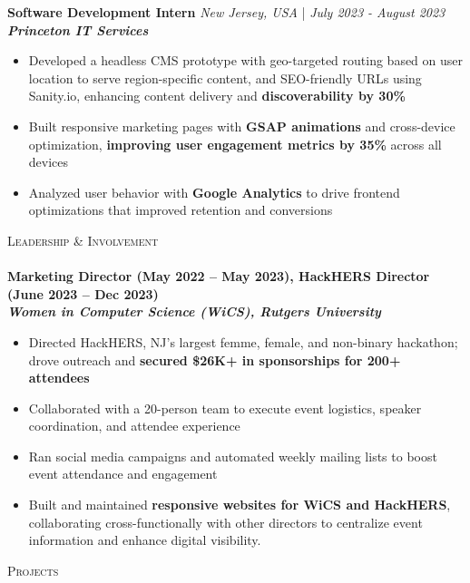 \documentclass[a4paper]{article}
\newcommand{\lineunder} {
    \vspace*{-8pt} \\
    \hspace*{-18pt} \hrulefill \\
}
\newcommand{\header} [1] {
    {\hspace*{-18pt}\vspace*{6pt} \textsc{#1}}
    \vspace*{-6pt} \lineunder
}
\begin{document}
\vspace{-2mm}
\textbf{Software Development Intern} \hfill \textit{New Jersey, USA} | \textit{July 2023 - August 2023} \\
\textit{\textbf{Princeton IT Services}}
\vspace{-2.5mm}
\begin{itemize} \itemsep -4pt
    \item Developed a headless CMS prototype with geo-targeted routing based on user location to serve region-specific content, and SEO-friendly URLs using Sanity.io, enhancing content delivery and \textbf{discoverability by 30\%}
    \item Built responsive marketing pages with \textbf{GSAP animations} and cross-device optimization, \textbf{improving user engagement metrics by 35\%} across all devices
    \item Analyzed user behavior with \textbf{Google Analytics} to drive frontend optimizations that improved retention and conversions 
\end{itemize}
\vspace{-2mm}

%
%
\header{Leadership \& Involvement}
\textbf{Marketing Director (May 2022 – May 2023), HackHERS Director (June 2023 – Dec 2023)} \\
\textit{\textbf{Women in Computer Science (WiCS), Rutgers University}}
\vspace{-2.5mm}
\begin{itemize} \itemsep -4pt
  \item Directed HackHERS, NJ’s largest femme, female, and non-binary hackathon; drove outreach and \textbf{secured \$26K+ in sponsorships for 200+ attendees}
  \item Collaborated with a 20-person team to execute event logistics, speaker coordination, and attendee experience
  \item Ran social media campaigns and automated weekly mailing lists to boost event attendance and engagement
  \item Built and maintained \textbf{responsive websites for WiCS and HackHERS}, collaborating cross-functionally with other directors to centralize event information and enhance digital visibility.
\end{itemize}
\vspace{-2mm}

%
%
\header{Projects}
\end{document}
